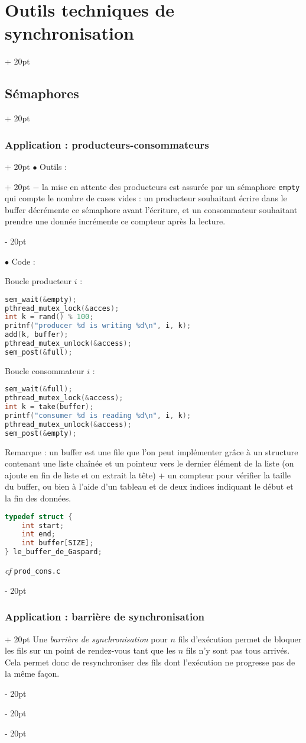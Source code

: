 \documentclass[a4paper, 12pt, twoside]{article}
\newcommand{\ind}[1][20pt]{\advance\leftskip + #1}
\newcommand{\deind}[1][20pt]{\advance\leftskip - #1}
\newenvironment{indt}[2][20pt]{#2 \par \ind[#1]}{\par \deind} %
\begin{document}
\begin{indt}{\section{Outils techniques de synchronisation}}
\begin{indt}{\subsection{Sémaphores}}
\begin{indt}{\subsubsection{Application : producteurs-consommateurs}}
\begin{indt}{$\bullet$ Outils :}
                    $-$ la mise en attente des producteurs est assurée par un sémaphore \texttt{empty} qui compte le nombre de cases vides : un producteur souhaitant écrire dans le buffer décrémente ce sémaphore avant l'écriture, et un consommateur souhaitant prendre une donnée incrémente ce compteur après la lecture.
                \end{indt}

                \vspace{6pt}
                
                $\bullet$ Code :

                Boucle producteur $i$ :
                \begin{lstlisting}[language=C, xleftmargin=80pt]
sem_wait(&empty);
pthread_mutex_lock(&acces);
int k = rand() % 100;
pritnf("producer %d is writing %d\n", i, k);
add(k, buffer);
pthread_mutex_unlock(&access);
sem_post(&full);\end{lstlisting}

                Boucle consommateur $i$ :
                \begin{lstlisting}[language=C, xleftmargin=80pt]
sem_wait(&full);
pthread_mutex_lock(&access);
int k = take(buffer);
printf("consumer %d is reading %d\n", i, k);
pthread_mutex_unlock(&access);
sem_post(&empty);\end{lstlisting}

                Remarque : un buffer est une file que l'on peut implémenter grâce à un structure contenant une liste chaînée et un pointeur vers le dernier élément de la liste (on ajoute en fin de liste et on extrait la tête) + un compteur pour vérifier la taille du buffer, ou bien à l'aide d'un tableau et de deux indices indiquant le début et la fin des données.

                \begin{lstlisting}[language=C, xleftmargin=80pt]
typedef struct {
    int start;
    int end;
    int buffer[SIZE];
} le_buffer_de_Gaspard;\end{lstlisting}

                \textit{cf} \texttt{prod\_cons.c}
            \end{indt}

            \vspace{12pt}
            
            \begin{indt}{\subsubsection{Application : barrière de synchronisation}}
                Une \emph{barrière de synchronisation} pour $n$ fils d'exécution permet de bloquer les fils sur un point de rendez-vous tant que les $n$ fils n'y sont pas tous arrivés.
                Cela permet donc de resynchroniser des fils dont l'exécution ne progresse pas de la même façon.


\end{indt}
\end{indt}
\end{indt}
\end{document}
